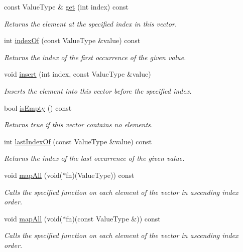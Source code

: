 \begin{DoxyCompactItemize}
const Value\+Type \& \mbox{\hyperlink{classVector_adcb38df411d14f0bd9c14e23947d2e1c}{get}} (int index) const
\begin{DoxyCompactList}\small\item\em Returns the element at the specified index in this vector. \end{DoxyCompactList}\item 
int \mbox{\hyperlink{classVector_a619aacfb96804495d3182a7131cf3539}{index\+Of}} (const Value\+Type \&value) const
\begin{DoxyCompactList}\small\item\em Returns the index of the first occurrence of the given value. \end{DoxyCompactList}\item 
void \mbox{\hyperlink{classVector_a0b5f5f8e87079d043caa9e5ed00d2941}{insert}} (int index, const Value\+Type \&value)
\begin{DoxyCompactList}\small\item\em Inserts the element into this vector before the specified index. \end{DoxyCompactList}\item 
bool \mbox{\hyperlink{classVector_acf82f9b2937375c7b1cf3dccb3df3312}{is\+Empty}} () const
\begin{DoxyCompactList}\small\item\em Returns {\ttfamily true} if this vector contains no elements. \end{DoxyCompactList}\item 
int \mbox{\hyperlink{classVector_a48d608a1714954f0a7bcac6459483cb6}{last\+Index\+Of}} (const Value\+Type \&value) const
\begin{DoxyCompactList}\small\item\em Returns the index of the last occurrence of the given value. \end{DoxyCompactList}\item 
void \mbox{\hyperlink{classVector_a2931bda025b4800f128f37790d21f49f}{map\+All}} (void($\ast$fn)(Value\+Type)) const
\begin{DoxyCompactList}\small\item\em Calls the specified function on each element of the vector in ascending index order. \end{DoxyCompactList}\item 
void \mbox{\hyperlink{classVector_a395b81e6a77aa9702362198771785dfd}{map\+All}} (void($\ast$fn)(const Value\+Type \&)) const
\begin{DoxyCompactList}\small\item\em Calls the specified function on each element of the vector in ascending index order. \end{DoxyCompactList}\item 

\end{DoxyCompactItemize}
